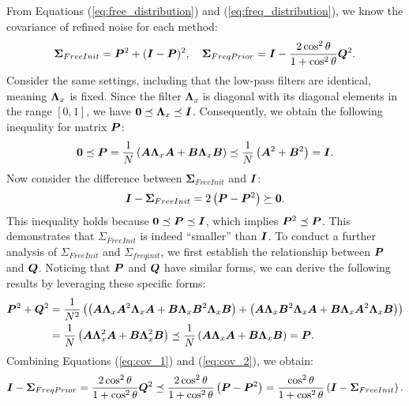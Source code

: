 \label{appendix:covariance}
From Equations (\ref{eq:free_distribution}) and (\ref{eq:freq_distribution}), we know the covariance of refined noise for each method:
\begin{equation}
    \mathbf{\Sigma}_{FreeInit} = {\bm{P}}^2 + ({\bm{I}}-{\bm{P}})^2,\quad \mathbf{\Sigma}_{FreqPrior} = {\bm{I}} - \frac{2\cos^2\theta}{1+\cos^2\theta}{\bm{Q}}^2.
\end{equation}
Consider the same settings, including that the low-pass filters are identical, meaning ${\bm{\Lambda}}_x$ is fixed.
Since the filter $\mathbf\Lambda_x$ is diagonal with its diagonal elements in the range $[0, 1]$, we have $\mathbf{0}\preceq{\bm{\Lambda}}_x\preceq{\bm{I}}$. 
Consequently, we obtain the following inequality for matrix ${\bm{P}}$:
\begin{equation}
    \mathbf{0}\preceq {\bm{P}} = \frac{1}{N}\left( {\bm{A}}{\bm{\Lambda}}_x{\bm{A}}+{\bm{B}}{\bm{\Lambda}}_x{\bm{B}}\right) \preceq \frac{1}{N}\left( {\bm{A}}^2+{\bm{B}}^2\right)={\bm{I}}.
\end{equation}
Now consider the difference between $\mathbf{\Sigma}_{FreeInit}$ and ${\bm{I}}$:
\begin{equation}
\label{eq:cov_1}
    {\bm{I}}-\mathbf{\Sigma}_{FreeInit} = 2\left({\bm{P}} - {\bm{P}}^2\right)\succeq \mathbf{0}.
\end{equation}
This inequality holds because $\mathbf{0}\preceq {\bm{P}} \preceq {\bm{I}}$, which implies ${\bm{P}}^2\preceq {\bm{P}}$. This demonstrates that $\Sigma_{FreeInit}$ is indeed ``smaller'' than ${\bm{I}}$.
To conduct a further analysis of $\Sigma_{FreeInit}$ and $\Sigma_{freqinit}$, we first establish the relationship between ${\bm{P}}$ and ${\bm{Q}}$.
Noticing that ${\bm{P}}$ and ${\bm{Q}}$ have similar forms,
we can derive the following results by leveraging these specific forms:
\begin{equation}
\label{eq:cov_2}
\begin{split}
    {\bm{P}}^2 + {\bm{Q}}^2 &= \frac{1}{N^2}\left(
    \left({\bm{A}}{\bm{\Lambda}}_x{\bm{A}}^2{\bm{\Lambda}}_x{\bm{A}} + {\bm{B}}{\bm{\Lambda}}_x{\bm{B}}^2{\bm{\Lambda}}_x{\bm{B}}\right)+
    \left({\bm{A}}{\bm{\Lambda}}_x{\bm{B}}^2{\bm{\Lambda}}_x{\bm{A}} + {\bm{B}}{\bm{\Lambda}}_x{\bm{A}}^2{\bm{\Lambda}}_x{\bm{B}}\right)\right) \\
    &=\frac{1}{N}\left({\bm{A}}{\bm{\Lambda}}_x^2{\bm{A}}+{\bm{B}}{\bm{\Lambda}}_x^2{\bm{B}}\right) 
    \preceq 
    \frac{1}{N}\left({\bm{A}}{\bm{\Lambda}}_x{\bm{A}}+{\bm{B}}{\bm{\Lambda}}_x{\bm{B}}\right) = {\bm{P}}.
\end{split}
\end{equation}
Combining Equations (\ref{eq:cov_1}) and (\ref{eq:cov_2}), we obtain:
\begin{equation}
\label{eq:covariance_error_two}
    {\bm{I}}-\mathbf{\Sigma}_{FreqPrior} = \frac{2\cos^2\theta}{1+\cos^2\theta}{\bm{Q}}^2 \preceq \frac{2\cos^2\theta}{1+\cos^2\theta}\left({\bm{P}} - {\bm{P}}^2\right) = \frac{\cos^2\theta}{1+\cos^2\theta}\left({\bm{I}}-\mathbf{\Sigma}_{FreeInit}\right).
\end{equation}
